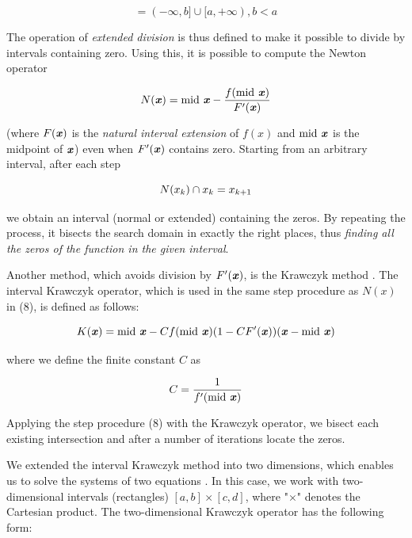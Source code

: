 \documentclass[pre, amsmath, amssymb, onecolumn, showpacs]{revtex4-1}
\begin{document}
\begin{equation}
[a, b] = (-\infty, b] \cup [a, +\infty), b < a
\end{equation}

The operation of \textit{extended division} is thus defined to make it possible to divide by intervals containing zero. Using this, it is possible to compute the Newton operator

\begin{equation}
N(\textbf{\emph{x}}) = \text{mid } \textbf{\emph{x}} - \frac{f(\text{mid } \textbf{\emph{x}})}{F'(\textbf{\emph{x}})}
\end{equation}

(where $F(\textbf{\emph{x}})$ is the \textit{natural interval extension} of $f(x)$ \cite{tucker2011validated} and $\text{mid } \textbf{\emph{x}}$ is the midpoint of $\textbf{\emph{x}}$) even when $F'(\textbf{\emph{x}})$ contains zero. Starting from an arbitrary interval, after each step

\begin{equation}
N(\textbf{\emph{$x_k$}}) \cap \textbf{\emph{$x_k$}} = \textbf{\emph{$x_{k+1}$}}
\end{equation}

we obtain an interval (normal or extended) containing the zeros. By repeating the process, it bisects the search domain in exactly the right places, thus \textit{finding all the zeros of the function in the given interval}.

Another method, which avoids division by $F'(\textbf{\emph{x}})$, is the Krawczyk method \cite{krawczyk1969newton}. The interval Krawczyk operator, which is used in the same step procedure as $N(x)$ in (8), is defined as follows:

\begin{equation}
K(\textbf{\emph{x}}) = \text{mid } \textbf{\emph{x}} - C f(\text{mid } \textbf{\emph{x}})(1 - C F'(\textbf{\emph{x}})) (\textbf{\emph{x}} - \text{mid } \textbf{\emph{x}})  
\end{equation}

where we define the finite constant $C$ as

\begin{equation}
C = \frac{1}{f'(\text{mid } \textbf{\emph{x}})} 
\end{equation}

Applying the step procedure (8) with the Krawczyk operator, we bisect each existing intersection and after a number of iterations locate the zeros.

We extended the interval Krawczyk method into two dimensions, which enables us to solve the systems of two equations \cite{moore2009introduction}. In this case, we work with two-dimensional intervals (rectangles) $[a, b] \times [c, d]$, where "$\times$" denotes the Cartesian product. The two-dimensional Krawczyk operator has the following form:
\end{document}
